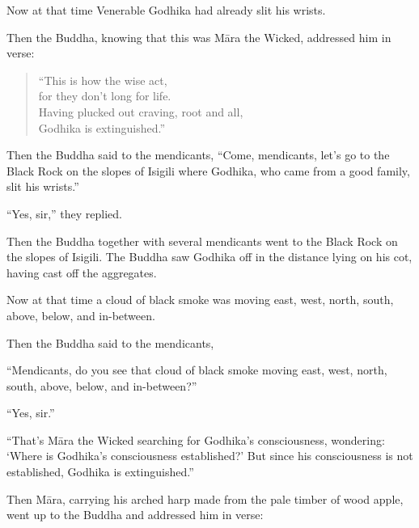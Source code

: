 \documentclass[12pt,openany]{book}%
\begin{document}
Now at that time Venerable Godhika had already slit his wrists. 

Then the Buddha, knowing that this was \textsanskrit{Māra} the Wicked, addressed him in verse: 

\begin{verse}%
“This is how the wise act, \\
for they don’t long for life. \\
Having plucked out craving, root and all, \\
Godhika is extinguished.” 

%
\end{verse}

Then the Buddha said to the mendicants, “Come, mendicants, let’s go to the Black Rock on the slopes of Isigili where Godhika, who came from a good family, slit his wrists.” 

“Yes, sir,” they replied. 

Then the Buddha together with several mendicants went to the Black Rock on the slopes of Isigili. The Buddha saw Godhika off in the distance lying on his cot, having cast off the aggregates. 

Now at that time a cloud of black smoke was moving east, west, north, south, above, below, and in-between. 

Then the Buddha said to the mendicants, 

“Mendicants, do you see that cloud of black smoke moving east, west, north, south, above, below, and in-between?” 

“Yes, sir.” 

“That’s \textsanskrit{Māra} the Wicked searching for Godhika’s consciousness, wondering: ‘Where is Godhika’s consciousness established?’ But since his consciousness is not established, Godhika is extinguished.” 

Then \textsanskrit{Māra}, carrying his arched harp made from the pale timber of wood apple, went up to the Buddha and addressed him in verse: 
\end{document}
